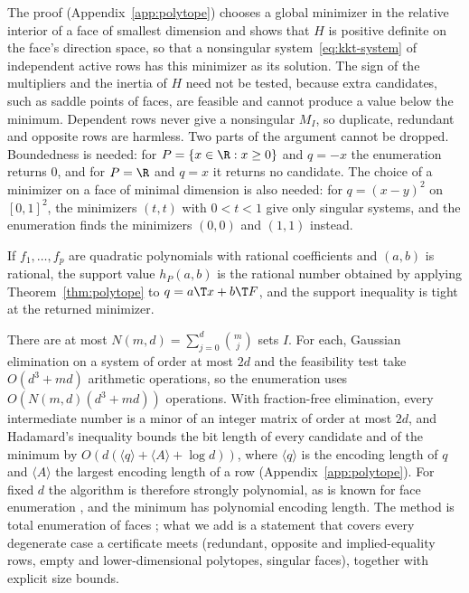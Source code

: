 The proof (Appendix~\ref{app:polytope}) chooses a global minimizer in the
relative interior of a face of smallest dimension and shows that $H$ is
positive definite on the face's direction space, so that a nonsingular
system~\eqref{eq:kkt-system} of independent active rows has this minimizer
as its solution. The sign of the multipliers and the inertia of $H$ need not
be tested, because extra candidates, such as saddle points of faces, are
feasible and cannot produce a value below the minimum. Dependent rows never
give a nonsingular $M_I$, so duplicate, redundant and opposite rows are
harmless. Two parts of the argument cannot be dropped. Boundedness is needed:
for $P=\{x\in\R:x\ge0\}$ and $q=-x$ the enumeration returns $0$, and for
$P=\R$ and $q=x$ it returns no candidate. The choice of a minimizer on a face
of minimal dimension is also needed: for $q=(x-y)^2$ on $[0,1]^2$, the
minimizers $(t,t)$ with $0<t<1$ give only singular systems, and the
enumeration finds the minimizers $(0,0)$ and $(1,1)$ instead.

\begin{corollary}\label{cor:quad-features}
If $f_1,\dots,f_p$ are quadratic polynomials with rational coefficients and
$(a,b)$ is rational, the support value $h_P(a,b)$ is the rational number
obtained by applying Theorem~\ref{thm:polytope} to $q=a\T x+b\T F$, and the
support inequality is tight at the returned minimizer.
\end{corollary}

There are at most $N(m,d)=\sum_{j=0}^d\binom mj$ sets $I$. For each,
Gaussian elimination on a system of order at most $2d$ and the feasibility
test take $O(d^3+md)$ arithmetic operations, so the enumeration uses
$O(N(m,d)(d^3+md))$ operations. With fraction-free elimination, every
intermediate number is a minor of an integer matrix of order at most $2d$,
and Hadamard's inequality bounds the bit length of every candidate and of
the minimum by $O(d(\langle q\rangle+\langle A\rangle+\log d))$, where
$\langle q\rangle$ is the encoding length of $q$ and $\langle A\rangle$ the
largest encoding length of a row (Appendix~\ref{app:polytope}). For fixed
$d$ the algorithm is therefore strongly polynomial, as is known for face
enumeration \citep{Vavasis1990,DelPiaDeyMolinaro2017}, and the minimum has
polynomial encoding length. The method is total enumeration of faces
\citep[Section~2.9]{Murty1997}; what we add is a statement that covers every
degenerate case a certificate meets (redundant, opposite and implied-equality
rows, empty and lower-dimensional polytopes, singular faces), together with
explicit size bounds.

